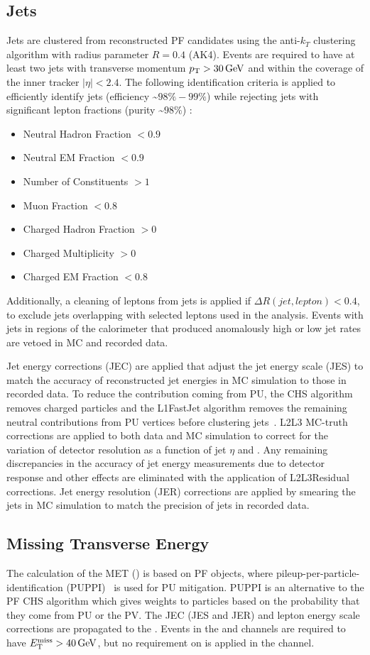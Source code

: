\subsection{Jets}
Jets are clustered from reconstructed PF candidates using the anti-$k_T$ clustering algorithm with radius parameter $R = 0.4$ (AK4).
Events are required to have at least two jets with transverse momentum $\pT > \SI{30}{\GeV}$ and within the coverage of the inner tracker $\vert \eta \vert < 2.4$. 
The following identification criteria is applied to efficiently identify jets (efficiency \sim $98\% - 99\%$) while rejecting jets with significant lepton fractions (purity \sim $98\%$) :
\begin{itemize}
\item Neutral Hadron Fraction $<0.9$
\item Neutral EM Fraction $<0.9$
\item Number of Constituents $>1$
\item Muon Fraction $<0.8$
\item Charged Hadron Fraction $>0$
\item Charged Multiplicity $> 0$
\item Charged EM Fraction $<0.8$ 
\end{itemize}
Additionally, a cleaning of leptons from jets is applied if $\Delta R(jet,lepton)<0.4$, to exclude jets overlapping with selected leptons used in the analysis.
Events with jets in regions of the calorimeter that produced anomalously high or low jet rates are vetoed in MC and recorded data.

Jet energy corrections (JEC) are applied that adjust the jet energy scale (JES) to match the accuracy of reconstructed jet energies in MC simulation to those in recorded data.
To reduce the contribution coming from PU, the CHS algorithm removes charged particles and the L1FastJet algorithm removes the remaining neutral contributions from PU vertices before clustering jets~\cite{bib:JME18001}.
L2L3 MC-truth corrections are applied to both data and MC simulation to correct for the variation of detector resolution as a function of jet $\eta$ and \pT.
Any remaining discrepancies in the accuracy of jet energy measurements due to detector response and other effects are eliminated with the application of L2L3Residual corrections.
Jet energy resolution (JER) corrections are applied by smearing the jets in MC simulation to match the precision of jets in recorded data.

\subsection{Missing Transverse Energy}
The calculation of the MET (\ETmiss) is based on PF objects, where pileup-per-particle-identification (PUPPI)~\cite{bib:PUPPI} is used for PU mitigation.
PUPPI is an alternative to the PF CHS algorithm which gives weights to particles based on the probability that they come from PU or the PV.
The JEC (JES and JER) and lepton energy scale corrections are propagated to the \ETmiss.
Events in the \ee and \mumu channels are required to have $\ETmiss > \SI{40}{\GeV}$, but no requirement on \ETmiss is applied in the \emu channel.

